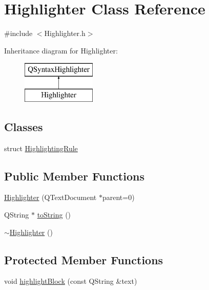 \hypertarget{class_highlighter}{\section{Highlighter Class Reference}
\label{class_highlighter}
}


{\ttfamily \#include $<$Highlighter.\-h$>$}

Inheritance diagram for Highlighter\-:\begin{figure}[H]
\begin{center}
\leavevmode
\includegraphics[height=2.000000cm]{class_highlighter}
\end{center}
\end{figure}
\subsection*{Classes}
\begin{DoxyCompactItemize}
\item 
struct \hyperlink{struct_highlighter_1_1_highlighting_rule}{Highlighting\-Rule}
\end{DoxyCompactItemize}
\subsection*{Public Member Functions}
\begin{DoxyCompactItemize}
\item 
\hyperlink{class_highlighter_af9fa54a58a9365e91e5f8eccf22f5153}{Highlighter} (Q\-Text\-Document $\ast$parent=0)
\item 
Q\-String $\ast$ \hyperlink{class_highlighter_a0bef7c2e3878ff916681455e906acbf9}{to\-String} ()
\item 
\hyperlink{class_highlighter_a3c339de18ac3c2334b69480baee54dd5}{$\sim$\-Highlighter} ()
\end{DoxyCompactItemize}
\subsection*{Protected Member Functions}
\begin{DoxyCompactItemize}
\item 
void \hyperlink{class_highlighter_ad07c7fd55d2ce2c675bca607b9370488}{highlight\-Block} (const Q\-String \&text)
\end{DoxyCompactItemize}
